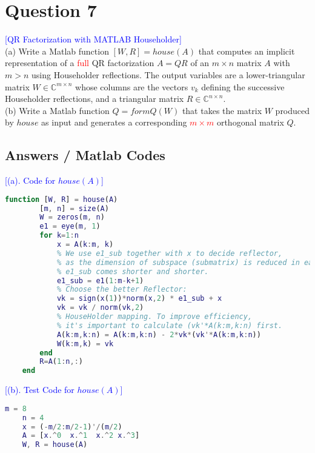 \section*{Question 7}
\textcolor{blue}{[QR Factorization with MATLAB Householder]} 
\\
(a) Write a Matlab function $[W,R] = house(A)$ that computes an implicit representation 
of a \textcolor{red}{full} QR factorization 
$A = QR$ of an $m \times n$ matrix $A$ with $m > n$ using Householder reflections. 
The output variables are a lower-triangular matrix $W \in \mathbb{C}^{m \times n}$ 
whose columns are the vectors $v_k$ defining the successive Householder reflections, 
and a triangular matrix $R \in \mathbb{C}^{n \times n}$.
\\
(b) Write a Matlab function $Q = formQ(W)$ that takes 
the matrix $W$ produced by $house$ as input 
and generates a corresponding \textcolor{red}{$m \times m$} orthogonal matrix $Q$.

\subsection*{Answers / Matlab Codes}
\textcolor{blue}{[(a). Code for $house(A)$]} 
\begin{lstlisting}[language=matlab]
    function [W, R] = house(A)
        [m, n] = size(A)
        W = zeros(m, n)
        e1 = eye(m, 1)
        for k=1:n
            x = A(k:m, k)
            % We use e1_sub together with x to decide reflector,
            % as the dimension of subspace (submatrix) is reduced in each loop,
            % e1_sub comes shorter and shorter.
            e1_sub = e1(1:m-k+1)
            % Choose the better Reflector:
            vk = sign(x(1))*norm(x,2) * e1_sub + x
            vk = vk / norm(vk,2)
            % HouseHolder mapping. To improve efficiency, 
            % it's important to calculate (vk'*A(k:m,k:n) first.
            A(k:m,k:n) = A(k:m,k:n) - 2*vk*(vk'*A(k:m,k:n)) 
            W(k:m,k) = vk
        end
        R=A(1:n,:)
    end
\end{lstlisting}

\textcolor{blue}{[(b). Test Code for $house(A)$]} 
\begin{lstlisting}[language=matlab]
    m = 8
    n = 4
    x = (-m/2:m/2-1)'/(m/2)
    A = [x.^0  x.^1  x.^2 x.^3]
    W, R = house(A)
\end{lstlisting}






